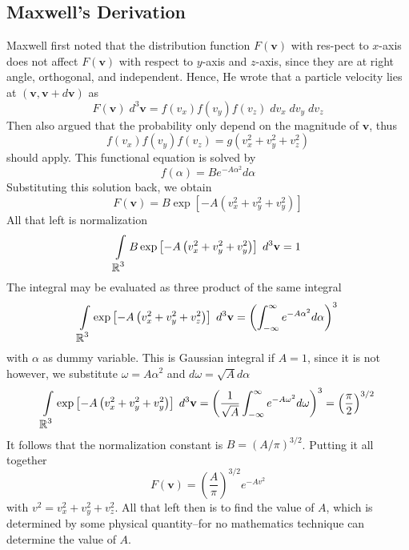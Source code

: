 \documentclass[../../../Main.tex]{subfiles}
\begin{document}
\subsection*{Maxwell's Derivation}
Maxwell first noted that the distribution function $F(\mathbf{v})$ with res-pect to $x$-axis does not affect $F(\mathbf{v})$ with respect to $y$-axis and $z$-axis, since they are at right angle, orthogonal, and independent. Hence, He wrote that a particle velocity lies at $(\mathbf{v}, \mathbf{v}+d\mathbf{v})$ as 
\begin{equation*}
    F(\mathbf{v})\;d^3\mathbf{v}=f(v_x)f(v_y)f(v_z)\;dv_x\;dv_y\;dv_z
\end{equation*}
Then also argued that the probability only depend on the magnitude of $\mathbf{v}$, thus
\begin{equation*}
    f(v_x)f(v_y)f(v_z)= g(v_x^2+v_y^2+v_z^2)
\end{equation*}
should apply. This functional equation is solved by
\begin{equation*}
    f(\alpha)=Be^{-A\alpha^2}d\alpha
\end{equation*}
Substituting this solution back, we obtain 
\begin{equation*}
    F(\mathbf{v})=B \exp \left[-A\left(v_x^2+v_y^2+v_y^2\right)\right]
\end{equation*}
All that left is normalization
\begin{equation*}
    \int\displaylimits_{\displaystyle\mathbb{R}^3} B \exp \left[-A\left(v_x^2+v_y^2+v_y^2\right)\right]\; d^3\mathbf{v}=1
\end{equation*}
The integral may be evaluated as three product of the same integral
\begin{equation*}
    \int\displaylimits_{\displaystyle\mathbb{R}^3} \exp \left[-A\left(v_x^2+v_y^2+v_z^2\right)\right]\; d^3\mathbf{v} = \left(\int_{-\infty}^{\infty}e^{-A\alpha^2}d\alpha \right)^3
\end{equation*}
with $\alpha$ as dummy variable. This is Gaussian integral if $A=1$, since it is not however, we substitute $\omega=A\alpha^2$ and $d\omega=\sqrt{A}d\alpha$
\begin{equation*}
    \int\displaylimits_{\displaystyle\mathbb{R}^3} \exp \left[-A\left(v_x^2+v_y^2+v_y^2\right)\right]\; d^3\mathbf{v} = \left(\frac{1}{\sqrt{A}}\int_{-\infty}^{\infty}e^{-A\omega^2}d\omega\right)^3=\left(\frac{\pi}{2}\right)^{3/2}
\end{equation*}
It follows that the normalization constant is $B=(A/\pi)^{3/2}$. Putting it all together
\begin{equation*}
    F(\mathbf{v})= \left(\frac{A}{\pi}\right)^{3/2}e^{-Av^2}
\end{equation*}
with $v^2=v_x^2+v_y^2+v_z^2$. All that left then is to find the value of $A$, which is determined by some physical quantity--for no mathematics technique can determine the value of $A$.
\end{document}
